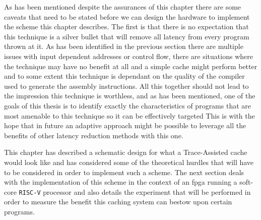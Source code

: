 As has been mentioned despite the assurances of this chapter there are some caveats that need to be stated before we can design the hardware to implement the scheme this chapter describes. The first is that there is no expectation that this technique is a silver bullet that will remove all latency from every program thrown at it. As has been identified in the previous section there are multiple issues with input dependent addresses or control flow, there are situations where the technique may have no benefit at all and a simple cache might perform better and to some extent this technique is dependant on the quality of the compiler used to generate the assembly instructions. All this together should not lead to the impression this technique is worthless, and as has been mentioned, one of the goals of this thesis is to identify exactly the characteristics of programs that are most amenable to this technique so it can be effectively targeted This is with the hope that in future an adaptive approach might be possible to leverage all the benefits of other latency reduction methods with this one.

This chapter has described a schematic design for what a Trace-Assisted cache would look like and has considered some of the theoretical hurdles that will have to be considered in order to implement such a scheme. The next section deals with the implementation of this scheme in the context of an \gls{fpga} running a soft-core \texttt{RISC-V} processor and also details the experiment that will be performed in order to measure the benefit this caching system can bestow upon certain programs. 